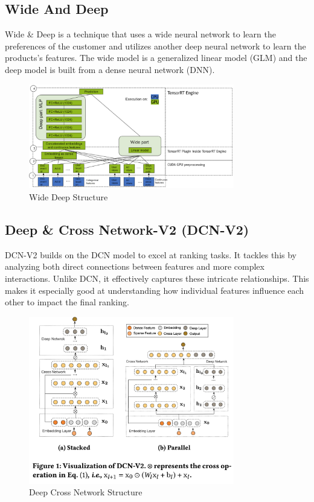 \subsection{Wide And Deep}
Wide \& Deep is a technique that uses a wide neural network to learn the preferences of the customer and utilizes another deep neural network to learn the products's features. The wide model is a generalized linear model (GLM) and the deep model is built from a dense neural network (DNN).
\begin{figure}[H]
    \centering
    \includegraphics[width=0.8\textwidth]{assets/wide_deep.png}
    \caption[Wide Deep Structure]{Wide Deep Structure \cite{NvidiaRecSys}}
    \label{fig:wide-deep}
\end{figure}
\subsection{Deep \& Cross Network-V2 (DCN-V2)}
DCN-V2 builds on the DCN model to excel at ranking tasks. It tackles this by analyzing both direct connections between features and more complex interactions. Unlike DCN, it effectively captures these intricate relationships. This makes it especially good at understanding how individual features influence each other to impact the final ranking.\cite{DCNv2}
\begin{figure}[H]
    \centering
    \includegraphics[width=0.8\textwidth]{assets/dcn-v2.png}
    \caption[Deep Cross Network Structure]{Deep Cross Network Structure \cite{DCNv2}}
    \label{fig:deep-cross-network}
\end{figure}

